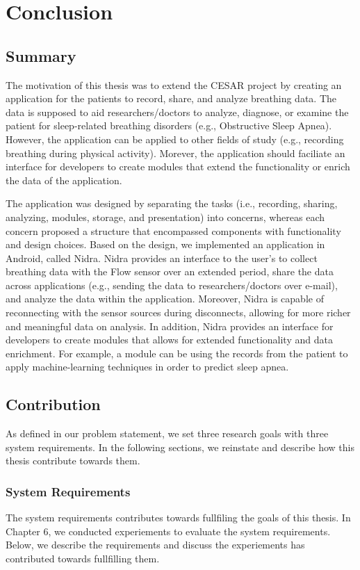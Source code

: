 \chapter{Conclusion}

\section{Summary}
The motivation of this thesis was to extend the CESAR project by creating an application for the patients to record, share, and analyze breathing data. The data is supposed to aid researchers/doctors to analyze, diagnose, or examine the patient for sleep-related breathing disorders (e.g., Obstructive Sleep Apnea). However, the application can be applied to other fields of study (e.g., recording breathing during physical activity). Morever, the application should faciliate an interface for developers to create modules that extend the functionality or enrich the data of the application.

The application was designed by separating the tasks (i.e., recording, sharing, analyzing, modules, storage, and presentation) into concerns, whereas each concern proposed a structure that encompassed components with functionality and design choices. Based on the design, we implemented an application in Android, called Nidra. Nidra provides an interface to the user's to collect breathing data with the Flow sensor over an extended period, share the data across applications (e.g., sending the data to researchers/doctors over e-mail), and analyze the data within the application. Moreover, Nidra is capable of reconnecting with the sensor sources during disconnects, allowing for more richer and meaningful data on analysis. In addition, Nidra provides an interface for developers to create modules that allows for extended functionality and data enrichment. For example, a module can be using the records from the patient to apply machine-learning techniques in order to predict sleep apnea. 



\section{Contribution}
 As defined in our problem statement, we set three research goals with three system requirements. In the following sections, we reinstate and describe how this thesis contribute towards them.

\subsection{System Requirements}
The system requirements contributes towards fullfiling the goals of this thesis. In Chapter 6, we conducted experiements to evaluate the system requirements. Below, we describe the requirements and discuss the experiements has contributed towards fullfilling them. 

